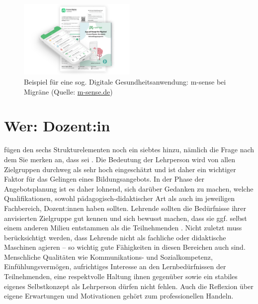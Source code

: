 \documentclass[
  twoside,
  parskip=half-,
]{scrreprt}
\begin{document}
\begin{figure}
  \centering
  \includegraphics[width=0.5\textwidth]{Grafiken/Infopaket_M-sense_Migraene-2.png}
  \caption{Beispiel für eine sog. Digitale Gesundheitsanwendung: m-sense bei Migräne (Quelle: \url{m-sense.de})}
  \label{fig:msense}
\end{figure}

\section{Wer: Dozent:in}\label{sec:wer}
\citeauthor{reich-claassen} fügen den sechs Strukturelementen noch ein siebtes hinzu, nämlich die Frage nach dem  Sie merken an, dass  sei \autocite[1010]{reich-claassen}. Die Bedeutung der Lehrperson wird von allen Zielgruppen durchweg als sehr hoch eingeschätzt und ist daher ein wichtiger Faktor für das Gelingen eines Bildungsangebots. In der Phase der Angebotsplanung ist es daher lohnend, sich darüber Gedanken zu machen, welche Qualifikationen, sowohl pädagogisch-didaktischer Art als auch im jeweiligen Fachbereich, Dozent:innen haben sollten. Lehrende sollten die Bedürfnisse ihrer anvisierten Zielgruppe gut kennen und sich bewusst machen, dass sie ggf. selbst einem anderen Milieu entstammen als die Teilnehmenden \autocite[vgl.][1011]{reich-claassen}. Nicht zuletzt muss berücksichtigt werden, dass Lehrende nicht als fachliche oder didaktische Maschinen agieren -- so wichtig gute Fähigkeiten in diesen Bereichen auch sind. Menschliche Qualitäten wie Kommunikations- und Sozialkompetenz, Einfühlungsvermögen, aufrichtiges Interesse an den Lernbedürfnissen der Teilnehmenden, eine respektvolle Haltung ihnen gegenüber sowie ein stabiles eigenes Selbstkonzept als Lehrperson dürfen nicht fehlen. Auch die Reflexion über eigene Erwartungen und Motivationen gehört zum professionellen Handeln.
\end{document}
